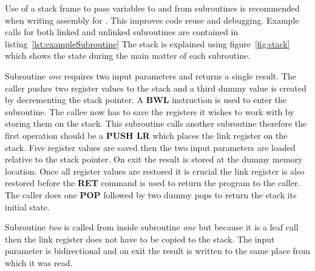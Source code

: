 Use of a stack frame to pass variables to and from subroutines is recommended when writing assembly for \samurai{}.
This improves code reuse and debugging. 
Example calls for both linked and unlinked subroutines are contained in listing~\ref{lst:exampleSubroutine}
The stack is explained using figure~\ref{fig:stack} which shows the state during the main matter of each subroutine.

Subroutine \emph{one} requires two input parameters and returns a single result.
The caller pushes two register values to the stack and a third dummy value is created by decrementing the stack pointer.
A \textbf{BWL} instruction is used to enter the subroutine.
The callee now has to save the registers it wishes to work with by storing them on the stack.
This subroutine calls another subroutine therefore the first operation should be a \textbf{PUSH LR} which places the link register on the stack.
Five register values are saved then the two input parameters are loaded relative to the stack pointer.
On exit the result is stored at the dummy memory location.
Once all register values are restored it is crucial the link register is also restored before the \textbf{RET} command is used to return the program to the caller. 
The caller does one \textbf{POP} followed by two dummy pops to return the stack its initial state.

Subroutine \emph{two} is called from inside subroutine \emph{one} but because it is a leaf call then the link register does not have to be copied to the stack.
The input parameter is bidirectional and on exit the result is written to the same place from which it was read.

\begin{minipage}{\linewidth}

\end{minipage}

